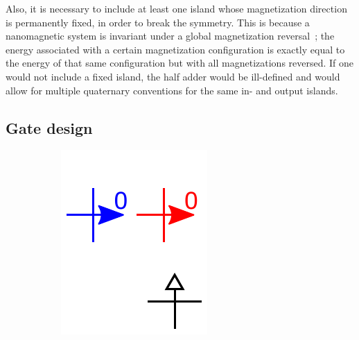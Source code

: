 \documentclass[11pt,a4paper,english,twoside]{article}
\begin{document}
Also, it is necessary to include at least one island whose magnetization direction is permanently fixed, in order to break the symmetry. This is because a nanomagnetic system is invariant under a global magnetization reversal~\cite{GYP-18}; the energy associated with a certain magnetization configuration is exactly equal to the energy of that same configuration but with all magnetizations reversed. If one would not include a fixed island, the half adder would be ill-defined and would allow for multiple quaternary conventions for the same in- and output islands. \par

\subsection{Gate design}
\begin{figure}[b!]
\centering
\begin{subfigure}[t]{0.2\textwidth}
    \includegraphics[width=\textwidth]{Figures/half_adder/schematic/000006_inputs_In1_0213/Input 0 deg arrowtext.pdf}

\end{subfigure}
\end{figure}
\end{document}
